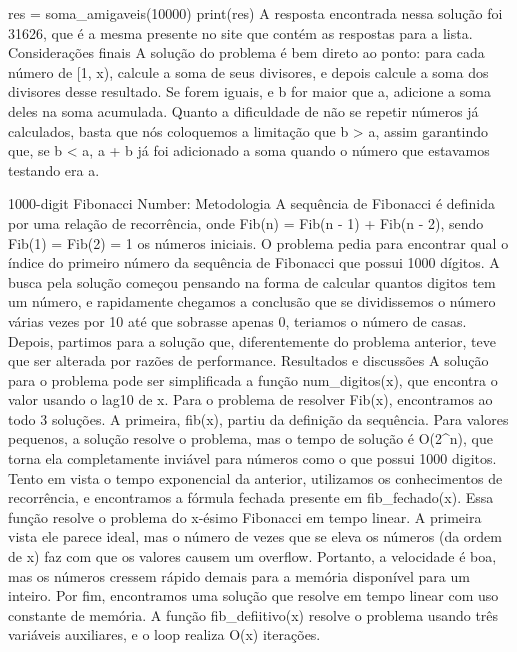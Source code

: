             res = soma_amigaveis(10000)
            print(res)
            A resposta encontrada nessa solução foi 31626, que é a mesma presente no site que contém as respostas para a lista.
        Considerações finais
            A solução do problema é bem direto ao ponto: para cada número de [1, x), calcule a soma de seus divisores, e depois calcule a soma dos divisores desse resultado. Se forem iguais, e b for maior que a, adicione a soma deles na soma acumulada.
            Quanto a dificuldade de não se repetir números já calculados, basta que nós coloquemos a limitação que b > a, assim garantindo que, se b < a, a + b já foi adicionado a soma quando o número que estavamos testando era a.

    1000-digit Fibonacci Number:
        Metodologia
            A sequência de Fibonacci é definida por uma relação de recorrência, onde Fib(n) = Fib(n - 1) + Fib(n - 2), sendo Fib(1) = Fib(2) = 1 os números iniciais.
            O problema pedia para encontrar qual o índice do primeiro número da sequência de Fibonacci que possui 1000 dígitos.
            A busca pela solução começou pensando na forma de calcular quantos digitos tem um número, e rapidamente chegamos a conclusão que se dividissemos o número várias vezes por 10 até que sobrasse apenas 0, teriamos o número de casas. Depois, partimos para a solução que, diferentemente do problema anterior, teve que ser alterada por razões de performance.
        Resultados e discussões
            A solução para o problema pode ser simplificada a função num_digitos(x), que encontra o valor usando o lag10 de x. Para o problema de resolver Fib(x), encontramos ao todo 3 soluções.
            A primeira, fib(x), partiu da definição da sequência. Para valores pequenos, a solução resolve o problema, mas o tempo de solução é O(2^n), que torna ela completamente inviável para números como o que possui 1000 digitos.
            Tento em vista o tempo exponencial da anterior, utilizamos os conhecimentos de recorrência, e encontramos a fórmula fechada presente em fib_fechado(x). Essa função resolve o problema do x-ésimo Fibonacci em tempo linear. A primeira vista ele parece ideal, mas o número de vezes que se eleva os números (da ordem de x) faz com que os valores causem um overflow. Portanto, a velocidade é boa, mas os números cressem rápido demais para a memória disponível para um inteiro.
            Por fim, encontramos uma solução que resolve em tempo linear com uso constante de memória. A função fib_defiitivo(x) resolve o problema usando três variáveis auxiliares, e o loop realiza O(x) iterações.

